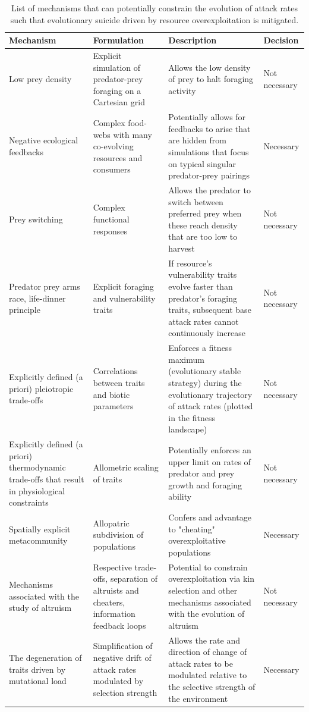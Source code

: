 \documentclass[a4paper]{report}
\begin{document}
\begin{table}[H]
\caption{List of mechanisms that can potentially constrain the evolution of attack rates such that evolutionary suicide driven by resource overexploitation is mitigated.}\label{tab:mechanisms}
\begin{tabular}{|p{3cm}|p{4cm}|p{6cm}|p{2.5cm}|}
\hline
Mechanism     & Formulation                                                                                                                                                                                                                           & Description & Decision      \\
\hline
Low prey density  & Explicit simulation of predator-prey foraging on a Cartesian grid  & 
Allows the low density of prey to halt foraging activity & Not necessary            \\
\hline
Negative ecological feedbacks &
Complex food-webs with many co-evolving resources and consumers  &
Potentially allows for feedbacks to arise that are hidden from simulations that focus on typical singular predator-prey pairings  & Necessary \\
\hline
Prey switching & 
Complex functional responses &
Allows the predator to switch between preferred prey when these reach density that are too low to harvest & Not necessary \\
\hline
Predator prey arms race, life-dinner principle &
Explicit foraging and vulnerability traits & 
If resource's vulnerability traits evolve faster than predator's foraging traits, subsequent base attack rates cannot continuously increase & Not necessary \\
\hline
Explicitly defined (a priori) pleiotropic trade-offs & 
Correlations between traits and biotic parameters & 
Enforces a fitness maximum (evolutionary stable strategy) during the evolutionary trajectory of attack rates (plotted in the fitness landscape) & Not necessary \\
 \hline
Explicitly defined (a priori) thermodynamic trade-offs that result in physiological constraints & 
Allometric scaling of traits & 
Potentially enforces an upper limit on rates of predator and prey growth and foraging ability & Not necessary \\
\hline
Spatially explicit metacommunity &
Allopatric subdivision of populations &
Confers and advantage to "cheating" overexploitative populations &  Necessary\\
\hline
Mechanisms associated with the study of altruism &
Respective trade-offs, separation of altruists and cheaters, information feedback loops &
Potential to constrain overexploitation via kin selection and other mechanisms associated with the evolution of altruism & Not necessary \\
\hline
The degeneration of traits driven by mutational load &
Simplification of negative drift of attack rates modulated by selection strength &
Allows the rate and direction of change of attack rates to be modulated relative to the selective strength of the environment & Necessary \\
\hline   
\end{tabular}
\end{table}
￹ 
\end{document}
